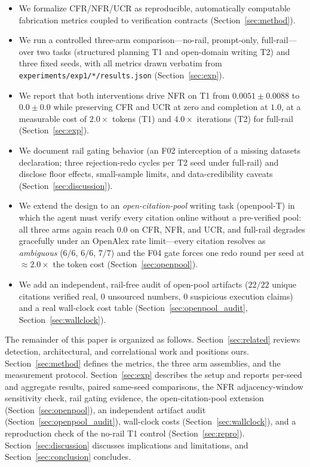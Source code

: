 \documentclass[10pt,twocolumn]{article}
\begin{document}
\begin{itemize}
\item We formalize CFR/NFR/UCR as reproducible, automatically computable fabrication metrics coupled to verification contracts (Section~\ref{sec:method}).
\item We run a controlled three-arm comparison---no-rail, prompt-only, full-rail---over two tasks (structured planning T1 and open-domain writing T2) and three fixed seeds, with all metrics drawn verbatim from \texttt{experiments/exp1/*/results.json} (Section~\ref{sec:exp}).
\item We report that both interventions drive NFR on T1 from $0.0051 \pm 0.0088$ to $0.0 \pm 0.0$ while preserving CFR and UCR at zero and completion at $1.0$, at a measurable cost of $2.0\times$ tokens (T1) and $4.0\times$ iterations (T2) for full-rail (Section~\ref{sec:exp}).
\item We document rail gating behavior (an F02 interception of a missing datasets declaration; three rejection-redo cycles per T2 seed under full-rail) and disclose floor effects, small-sample limits, and data-credibility caveats (Section~\ref{sec:discussion}).
\item We extend the design to an \emph{open-citation-pool} writing task (openpool-T) in which the agent must verify every citation online without a pre-verified pool: all three arms again reach $0.0$ on CFR, NFR, and UCR, and full-rail degrades gracefully under an OpenAlex rate limit---every citation resolves as \emph{ambiguous} ($6/6$, $6/6$, $7/7$) and the F04 gate forces one redo round per seed at $\approx 2.0\times$ the token cost (Section~\ref{sec:openpool}).
\item We add an independent, rail-free audit of open-pool artifacts ($22/22$ unique citations verified real, $0$ unsourced numbers, $0$ suspicious execution claims) and a real wall-clock cost table (Section~\ref{sec:openpool_audit}, Section~\ref{sec:wallclock}).
\end{itemize}

The remainder of this paper is organized as follows. Section~\ref{sec:related} reviews detection, architectural, and correlational work and positions ours. Section~\ref{sec:method} defines the metrics, the three arm assemblies, and the measurement protocol. Section~\ref{sec:exp} describes the setup and reports per-seed and aggregate results, paired same-seed comparisons, the NFR adjacency-window sensitivity check, rail gating evidence, the open-citation-pool extension (Section~\ref{sec:openpool}), an independent artifact audit (Section~\ref{sec:openpool_audit}), wall-clock costs (Section~\ref{sec:wallclock}), and a reproduction check of the no-rail T1 control (Section~\ref{sec:repro}). Section~\ref{sec:discussion} discusses implications and limitations, and Section~\ref{sec:conclusion} concludes.
\end{document}
